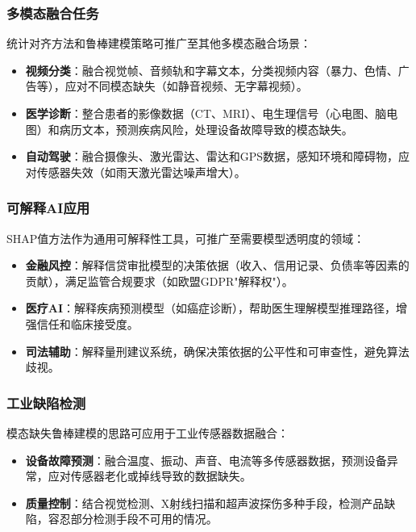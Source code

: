 \subsubsection{多模态融合任务}

统计对齐方法和鲁棒建模策略可推广至其他多模态融合场景：

\begin{itemize}
\item \textbf{视频分类}：融合视觉帧、音频轨和字幕文本，分类视频内容（暴力、色情、广告等），应对不同模态缺失（如静音视频、无字幕视频）。
\item \textbf{医学诊断}：整合患者的影像数据（CT、MRI）、电生理信号（心电图、脑电图）和病历文本，预测疾病风险，处理设备故障导致的模态缺失。
\item \textbf{自动驾驶}：融合摄像头、激光雷达、雷达和GPS数据，感知环境和障碍物，应对传感器失效（如雨天激光雷达噪声增大）。
\end{itemize}

\subsubsection{可解释AI应用}

SHAP值方法作为通用可解释性工具，可推广至需要模型透明度的领域：

\begin{itemize}
\item \textbf{金融风控}：解释信贷审批模型的决策依据（收入、信用记录、负债率等因素的贡献），满足监管合规要求（如欧盟GDPR"解释权"）。
\item \textbf{医疗AI}：解释疾病预测模型（如癌症诊断），帮助医生理解模型推理路径，增强信任和临床接受度。
\item \textbf{司法辅助}：解释量刑建议系统，确保决策依据的公平性和可审查性，避免算法歧视。
\end{itemize}

\subsubsection{工业缺陷检测}

模态缺失鲁棒建模的思路可应用于工业传感器数据融合：

\begin{itemize}
\item \textbf{设备故障预测}：融合温度、振动、声音、电流等多传感器数据，预测设备异常，应对传感器老化或掉线导致的数据缺失。
\item \textbf{质量控制}：结合视觉检测、X射线扫描和超声波探伤多种手段，检测产品缺陷，容忍部分检测手段不可用的情况。
\end{itemize}

